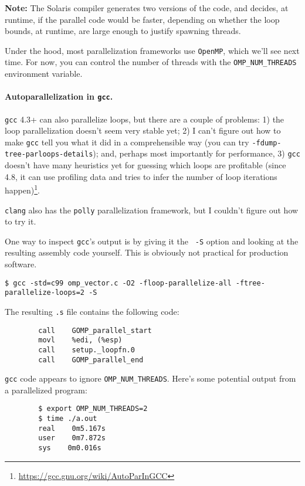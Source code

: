 {\bf Note:} The Solaris compiler generates two versions of the code,
and decides, at runtime, if the parallel code would be faster, depending on
whether the loop bounds, at runtime, are large enough to justify spawning
threads.

Under the hood, most parallelization frameworks use {\tt OpenMP},
which we'll see next time. For now, you can control the number of
threads with the {\tt OMP\_NUM\_THREADS} environment variable.

\paragraph{Autoparallelization in {\tt gcc}.} 
{\tt gcc} 4.3+ can also parallelize loops, but there are a couple of
problems: 1) the loop parallelization doesn't seem very stable yet; 2)
I can't figure out how to make {\tt gcc} tell you what it did in a comprehensible
way (you can try {\tt -fdump-tree-parloops-details}); and,
perhaps most importantly for performance, 3) {\tt gcc} doesn't have
many heuristics yet for guessing which loops are profitable (since 4.8, it can
use profiling data and tries to infer the number of loop iterations
happen)\footnote{\url{https://gcc.gnu.org/wiki/AutoParInGCC}}.

{\tt clang} also has the {\tt polly} parallelization framework, but I couldn't
figure out how to try it.

One way to inspect {\tt gcc}'s output is by giving it the {\tt
  -S} option and looking at the resulting assembly code yourself. This
is obviously not practical for production software.
\begin{verbatim}
$ gcc -std=c99 omp_vector.c -O2 -floop-parallelize-all -ftree-parallelize-loops=2 -S           
\end{verbatim}

The resulting {\tt .s} file contains the following code:

\begin{verbatim}
        call    GOMP_parallel_start
        movl    %edi, (%esp)
        call    setup._loopfn.0
        call    GOMP_parallel_end
\end{verbatim}
{\tt gcc} code appears to ignore \verb+OMP_NUM_THREADS+.  Here's
some potential output from a parallelized program:
\begin{verbatim}
        $ export OMP_NUM_THREADS=2
        $ time ./a.out
        real    0m5.167s
        user    0m7.872s
        sys    0m0.016s
\end{verbatim}


